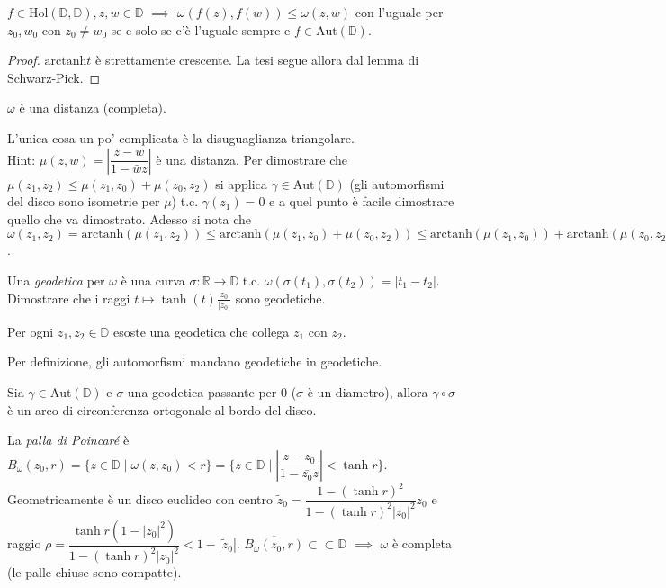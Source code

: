 \begin{cor}
  $f \in \text{Hol}(\mathbb{D}, \mathbb{D}), z, w \in \mathbb{D}$ $\implies$ $\omega(f(z), f(w)) \le \omega(z, w)$ con l'uguale per $z_0, w_0$ con $z_0 \not=w_0$ se e solo se c'è l'uguale sempre e $f \in \text{Aut}(\mathbb{D})$.
\end{cor}

\begin{proof}
  $\text{arctanh}t$ è strettamente crescente. La tesi segue allora dal lemma di Schwarz-Pick.
\end{proof}

\begin{exc}
  $\omega$ è una distanza (completa).
\end{exc}

\begin{sol}
  L'unica cosa un po' complicata è la disuguaglianza triangolare. \\
  Hint: $\mu(z, w)=\left|\dfrac{z-w}{1-\bar{w}z}\right|$ è una distanza. Per dimostrare che $\mu(z_1, z_2) \le \mu(z_1, z_0)+\mu(z_0, z_2)$ si applica $\gamma \in \text{Aut}(\mathbb{D})$ (gli automorfismi del disco sono isometrie per $\mu$) t.c. $\gamma(z_1)=0$ e a quel punto è facile dimostrare quello che va dimostrato.
  Adesso si nota che $\omega(z_1, z_2)=\text{arctanh}(\mu(z_1, z_2)) \le \text{arctanh}(\mu(z_1, z_0)+\mu(z_0, z_2)) \le \text{arctanh}(\mu(z_1, z_0))+\text{arctanh}(\mu(z_0, z_2))$.
\end{sol}

\begin{exc}
  Una \textit{geodetica} per $\omega$ è una curva $\sigma: \mathbb{R} \rightarrow \mathbb{D}$ t.c. $\omega(\sigma(t_1), \sigma(t_2))=|t_1-t_2|$. Dimostrare che i raggi $t \mapsto \tanh{(t)}\frac{z_0}{|z_0|}$ sono geodetiche.
\end{exc}

\begin{cor}
  Per ogni $z_1, z_2 \in \mathbb{D}$ esoste una geodetica che collega $z_1$ con $z_2$.
\end{cor}

Per definizione, gli automorfismi mandano geodetiche in geodetiche.

\begin{exc}
  Sia $\gamma \in \text{Aut}(\mathbb{D})$ e $\sigma$ una geodetica passante per $0$ ($\sigma$ è un diametro), allora $\gamma \circ \sigma$ è un arco di circonferenza ortogonale al bordo del disco.
\end{exc}

\begin{defn}
  La \textit{palla di Poincaré} è $B_{\omega}(z_0, r)=\{z \in \mathbb{D} \mid \omega(z, z_0)<r\}=\{z \in \mathbb{D} \mid \left|\dfrac{z-z_0}{1-\bar{z_0}z}\right|<\tanh{r}\}$.
  Geometricamente è un disco euclideo con centro $\tilde{z}_0=\dfrac{1-(\tanh{r})^2}{1-(\tanh{r})^2|z_0|^2}z_0$ e raggio $\rho=\dfrac{\tanh{r}(1-|z_0|^2)}{1-(\tanh{r})^2|z_0|^2}<1-|\tilde{z}_0|$.
  $\overline{B_{\omega}(z_0, r)} \subset \subset \mathbb{D}$ $\implies$ $\omega$ è completa (le palle chiuse sono compatte).
\end{defn}
